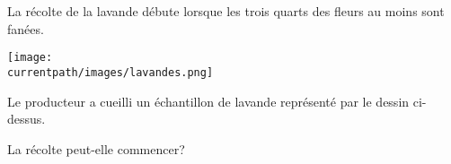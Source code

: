 \begin{exercice*}
    La récolte de la lavande débute lorsque les trois quarts des fleurs au moins sont fanées.

    \begin{center}
        \texttt{[image: \\currentpath/images/lavandes.png]}
    \end{center}

    Le producteur a cueilli un échantillon de lavande représenté par le dessin ci-dessus.

    La récolte peut-elle commencer?
\end{exercice*}
 

